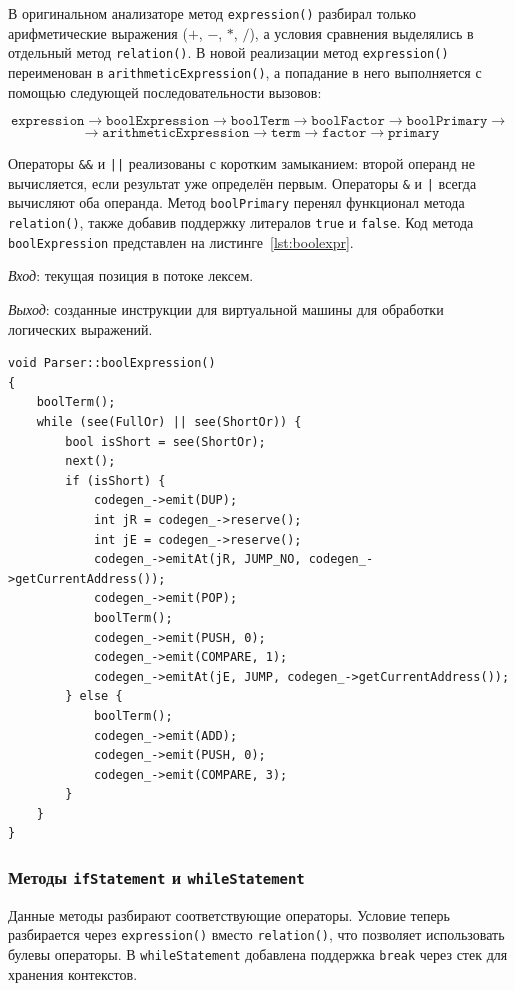 \documentclass[a4paper,final]{article}
\begin{document}
В оригинальном анализаторе метод \texttt{expression()} разбирал только
арифметические выражения ($+$, $-$, $*$, $/{}$), а условия сравнения выделялись
в отдельный метод \texttt{relation()}. В новой реализации метод \texttt{expression()} переименован
в \texttt{arithmeticExpression()}, а попадание в него выполняется с помощью следующей последовательности вызовов:

\[
\texttt{expression} \to \texttt{boolExpression} \to \texttt{boolTerm} \to
\texttt{boolFactor} \to \texttt{boolPrimary} \to
\]
\[
\to \texttt{arithmeticExpression}
\to \texttt{term} \to \texttt{factor} \to \texttt{primary}
\]

Операторы \texttt{\&\&} и \texttt{||} реализованы с коротким замыканием:
второй операнд не вычисляется, если результат уже определён первым.
Операторы \texttt{\&} и \texttt{|} всегда вычисляют оба операнда.
Метод \texttt{boolPrimary} перенял функционал метода
\texttt{relation()}, также добавив поддержку литералов \texttt{true} и
\texttt{false}. Код метода \texttt{boolExpression} представлен на
листинге~\ref{lst:boolexpr}.

\textit{Вход}: текущая позиция в
потоке лексем.

\textit{Выход}: созданные инструкции для виртуальной машины для обработки логических выражений.

\begin{lstlisting}[caption={Метод Parser::boolExpression}, label=lst:boolexpr]
void Parser::boolExpression()
{
    boolTerm();
    while (see(FullOr) || see(ShortOr)) {
        bool isShort = see(ShortOr);
        next();
        if (isShort) {
            codegen_->emit(DUP);
            int jR = codegen_->reserve();
            int jE = codegen_->reserve();
            codegen_->emitAt(jR, JUMP_NO, codegen_->getCurrentAddress());
            codegen_->emit(POP);
            boolTerm();
            codegen_->emit(PUSH, 0);
            codegen_->emit(COMPARE, 1);
            codegen_->emitAt(jE, JUMP, codegen_->getCurrentAddress());
        } else {
            boolTerm();
            codegen_->emit(ADD);
            codegen_->emit(PUSH, 0);
            codegen_->emit(COMPARE, 3);
        }
    }
}
\end{lstlisting}

\subsubsection*{Методы \texttt{ifStatement} и \texttt{whileStatement}}

Данные методы разбирают соответствующие операторы. Условие теперь разбирается через \texttt{expression()} вместо
\texttt{relation()}, что позволяет использовать булевы операторы.
В \texttt{whileStatement} добавлена поддержка \texttt{break} через стек для хранения контекстов.
\end{document}
